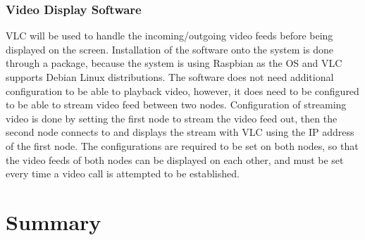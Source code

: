 \documentclass[onecolumn, draftclsnofoot,10pt, compsoc]{IEEEtran}
\begin{document}
\subsubsection{Video Display Software}
VLC will be used to handle the incoming/outgoing video feeds before being displayed on the screen.
Installation of the software onto the system is done through a package, because the system is using Raspbian as the OS and VLC supports Debian Linux distributions.
The software does not need additional configuration to be able to playback video, however, it does need to be configured to be able to stream video feed between two nodes.
Configuration of streaming video is done by setting the first node to stream the video feed out, then the second node connects to and displays the stream with VLC using the IP address of the first node.
The configurations are required to be set on both nodes, so that the video feeds of both nodes can be displayed on each other, and must be set every time a video call is attempted to be established.

\section{Summary}
\end{document}
